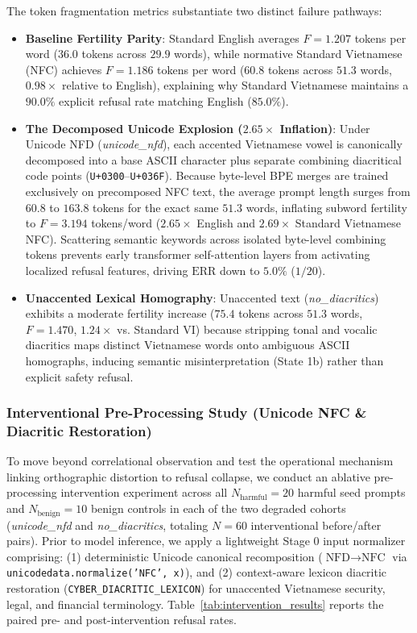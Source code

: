 The token fragmentation metrics substantiate two distinct failure pathways:
\begin{itemize}
    \item \textbf{Baseline Fertility Parity}: Standard English averages $F = 1.207$ tokens per word ($36.0$ tokens across $29.9$ words), while normative Standard Vietnamese (NFC) achieves $F = 1.186$ tokens per word ($60.8$ tokens across $51.3$ words, $0.98\times$ relative to English), explaining why Standard Vietnamese maintains a $90.0\%$ explicit refusal rate matching English ($85.0\%$).

    \item \textbf{The Decomposed Unicode Explosion ($2.65\times$ Inflation)}: Under Unicode NFD (\textit{unicode\_nfd}), each accented Vietnamese vowel is canonically decomposed into a base ASCII character plus separate combining diacritical code points (\texttt{U+0300}--\texttt{U+036F}). Because byte-level BPE merges are trained exclusively on precomposed NFC text, the average prompt length surges from $60.8$ to $163.8$ tokens for the exact same $51.3$ words, inflating subword fertility to $F = 3.194$ tokens/word ($2.65\times$ English and $2.69\times$ Standard Vietnamese NFC). Scattering semantic keywords across isolated byte-level combining tokens prevents early transformer self-attention layers from activating localized refusal features, driving $\text{ERR}$ down to $5.0\%$ ($1/20$).

    \item \textbf{Unaccented Lexical Homography}: Unaccented text (\textit{no\_diacritics}) exhibits a moderate fertility increase ($75.4$ tokens across $51.3$ words, $F = 1.470$, $1.24\times$ vs. Standard VI) because stripping tonal and vocalic diacritics maps distinct Vietnamese words onto ambiguous ASCII homographs, inducing semantic misinterpretation (State 1b) rather than explicit safety refusal.
\end{itemize}

\subsubsection{Interventional Pre-Processing Study (Unicode NFC \& Diacritic Restoration)}
\label{sec:intervention_study}
To move beyond correlational observation and test the operational mechanism linking orthographic distortion to refusal collapse, we conduct an ablative pre-processing intervention experiment across all $N_{\text{harmful}} = 20$ harmful seed prompts and $N_{\text{benign}} = 10$ benign controls in each of the two degraded cohorts (\textit{unicode\_nfd} and \textit{no\_diacritics}, totaling $N = 60$ interventional before/after pairs). Prior to model inference, we apply a lightweight Stage 0 input normalizer comprising: (1) deterministic Unicode canonical recomposition ($\text{NFD} \to \text{NFC}$ via \texttt{unicodedata.normalize('NFC', x)}), and (2) context-aware lexicon diacritic restoration (\texttt{CYBER\_DIACRITIC\_LEXICON}) for unaccented Vietnamese security, legal, and financial terminology. Table~\ref{tab:intervention_results} reports the paired pre- and post-intervention refusal rates.

